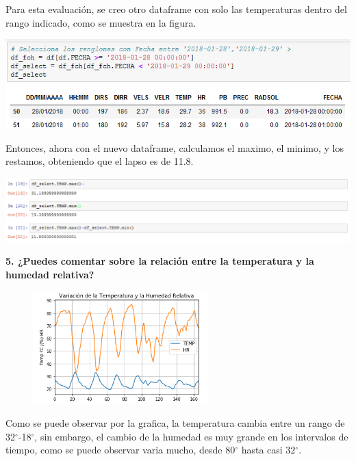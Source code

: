 \documentclass[12pt]{article}
\begin{document}
Para esta evaluación, se creo otro dataframe con solo las temperaturas dentro del rango indicado, como se muestra en la figura. 

\begin{center}
\includegraphics[scale=0.65]{Nuevodf.png}
\end{center}

Entonces, ahora con el nuevo dataframe, calculamos el maximo, el minimo, y los restamos, obteniendo que el lapso es de 11.8. 

\begin{center}
\includegraphics[scale=0.6]{diferencia.png}
\end{center}

\noindent\textbf {5. ¿Puedes comentar sobre la relación entre la temperatura y la humedad relativa?} \\

\begin{figure}
    \centering
    \includegraphics[width=0.6\textwidth]{VarTempHum.png}
\end{figure}

Como se puede observar por la grafica, la temperatura cambia entre un rango de 32$^{\circ}$-18$^{\circ}$, sin embargo, el cambio de la humedad es muy grande en los intervalos de tiempo, como se puede observar varia mucho, desde 80$^{\circ}$ hasta casi 32$^{\circ}$. \\ 
\end{document}
